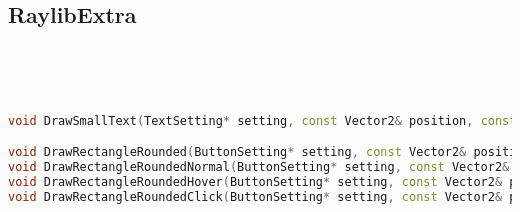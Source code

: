 \subsection{RaylibExtra}
\begin{lstlisting}[language=C++]




void DrawSmallText(TextSetting* setting, const Vector2& position, const string& str);

void DrawRectangleRounded(ButtonSetting* setting, const Vector2& position, const Vector2& size, const Color& tint);
void DrawRectangleRoundedNormal(ButtonSetting* setting, const Vector2& position, const Vector2& size);
void DrawRectangleRoundedHover(ButtonSetting* setting, const Vector2& position, const Vector2& size);
void DrawRectangleRoundedClick(ButtonSetting* setting, const Vector2& position, const Vector2& size);









\end{lstlisting}
